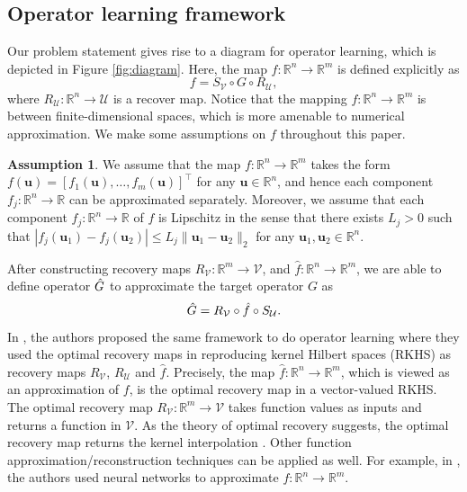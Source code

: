 \documentclass[11pt,twoside]{article}
\theoremstyle{plain}
\theoremstyle{definition}
\newtheorem{assumption}{Assumption}
\theoremstyle{remark}
\newcommand{\R}{\mathbb{R}}
\newcommand{\ub}{\mathbf{u}}
\newcommand{\Uc}{\mathcal{U}}
\newcommand{\Vc}{\mathcal{V}}
\begin{document}
\subsection{Operator learning framework}
Our problem statement gives rise to a diagram for operator learning, which is depicted in Figure \ref{fig:diagram}. Here, the map $f:\R^n\to\R^m$ is defined explicitly as 
\begin{equation}
\label{operator_f}
f = S_\Vc\circ G\circ R_\Uc,
\end{equation}
where $R_\Uc:\R^n\to\Uc$ is a recover map. Notice that the mapping $f:\R^n\to\R^m$ is between finite-dimensional spaces, which is more amenable to numerical approximation. We make some assumptions on $f$ throughout this paper.
\begin{assumption}
\label{Assmps:f}
We assume that the map $f:\R^n\to\R^m$ takes the form $f(\ub) = [f_1(\ub),\dots, f_m(\ub)]^\top$ for any $\ub\in\R^n$, and hence each component $f_j:\R^n\to\R$ can be approximated separately. Moreover, we assume that each component $f_j:\R^n\to\R$ of $f$ is Lipschitz in the sense that there exists $L_j>0$ such that $|f_j(\ub_1) - f_j(\ub_2)| \leq L_j\|\ub_1 - \ub_2\|_2$ for any $\ub_1,\ub_2\in\R^n$.
\end{assumption}
After constructing recovery maps $R_\Vc:\R^m\to\Vc$, and $\hat{f}:\R^n\to\R^m$, we are able to define operator $\Hat{G}$ to approximate the target operator $G$ as 
\begin{equation*}
\Hat{G} = R_\Vc\circ \Hat{f} \circ S_\Uc.    
\end{equation*}
In \cite{BATLLE2024kernel}, the authors proposed the same framework to do operator learning where they used the optimal recovery maps in reproducing kernel Hilbert spaces (RKHS) as recovery maps $R_\Vc$, $R_\Uc$ and $\hat{f}$. 
Precisely, the map $\hat{f}:\R^n\to\R^m$, which is viewed as an approximation of $f$, is the optimal recovery map in a vector-valued RKHS. The optimal recovery map $R_\Vc:\R^m\to\Vc$ takes function values as inputs and returns a function in $\Vc$. 
As the theory of optimal recovery suggests, the optimal recovery map returns the kernel interpolation \cite{Foucart2022LearningFN}. 
Other function approximation/reconstruction techniques can be applied as well. For example, in \cite{bartolucci2023representation}, the authors used neural networks to approximate $f:\R^n\to\R^m$.
\end{document}
